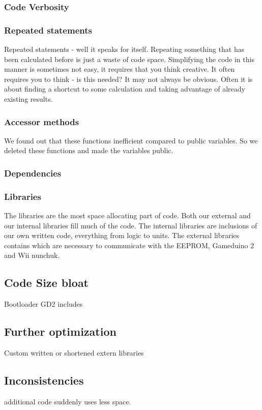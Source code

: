 \subsubsection{Code Verbosity}

\subsubsection{Repeated statements }
Repeated statements - well it speaks for itself. Repeating something that has been calculated
before is just a waste of code space. Simplifying the code in this manner is sometimes
not easy, it requires that you think creative. It often requires you to think - is this
needed? It may not always be obvious. Often it is about finding a shortcut to some
calculation and taking advantage of already existing results.

\subsubsection{Accessor methods}
We found out that these functions inefficient
compared to public variables. So we deleted these functions
and made the variables public.

\subsubsection{Dependencies}

\subsubsection{Libraries}
The libraries are the most space allocating part of code. Both our external and
our internal libraries fill much of the code. The internal libraries are
inclusions of our own written code, everything from logic to units. The external
libraries contains which are necessary to communicate with the EEPROM,
Gameduino 2 and Wii nunchuk.

\subsection{Code Size bloat} Bootloader GD2 includes \subsection{Further
optimization} Custom written or shortened extern libraries

\subsection{Inconsistencies} %
additional code suddenly uses less space.
